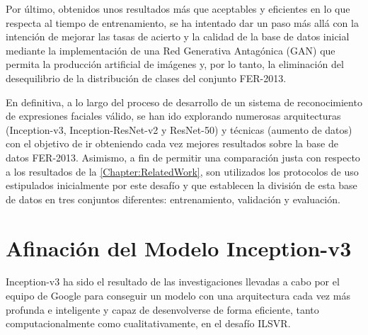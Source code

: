 Por último, obtenidos unos resultados más que aceptables y eficientes en lo que respecta al tiempo de entrenamiento, se ha intentado dar un paso más allá con la intención de mejorar las tasas de acierto y la calidad de la base de datos inicial mediante la implementación de una Red Generativa Antagónica (GAN) que permita la producción artificial de imágenes y, por lo tanto, la eliminación del desequilibrio de la distribución de clases del conjunto FER-2013.

En definitiva, a lo largo del proceso de desarrollo de un sistema de reconocimiento de expresiones faciales válido, se han ido explorando numerosas arquitecturas (Inception-v3, Inception-ResNet-v2 y ResNet-50) y técnicas (aumento de datos) con el objetivo de ir obteniendo cada vez mejores resultados sobre la base de datos FER-2013. Asimismo, a fin de permitir una comparación justa con respecto a los resultados de la \autoref{Chapter:RelatedWork}, son utilizados los protocolos de uso estipulados inicialmente por este desafío y que establecen la división de esta base de datos en tres conjuntos diferentes: entrenamiento, validación y evaluación.

\section{Afinación del Modelo Inception-v3}

Inception-v3 ha sido el resultado de las investigaciones llevadas a cabo por el equipo de Google para conseguir un modelo con una arquitectura cada vez más profunda e inteligente y capaz de desenvolverse de forma eficiente, tanto computacionalmente como cualitativamente, en el desafío ILSVR.


